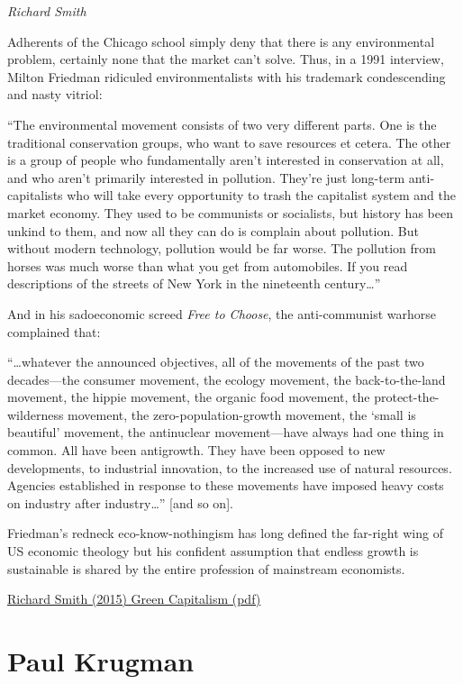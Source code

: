 \documentclass[
]{book}
\begin{document}
\emph{Richard Smith}

Adherents of the Chicago school simply deny
that there is any environmental problem, certainly none that the market can't solve.
Thus, in a 1991 interview, Milton Friedman ridiculed environmentalists with his
trademark condescending and nasty vitriol:

``The environmental movement consists of two very different
parts. One is the traditional conservation groups, who want to save
resources et cetera. The other is a group of people who
fundamentally aren't interested in conservation at all, and who
aren't primarily interested in pollution. They're just long-term
anti-capitalists who will take every opportunity to trash the
capitalist system and the market economy. They used to be
communists or socialists, but history has been unkind to them, and
now all they can do is complain about pollution. But without
modern technology, pollution would be far worse. The pollution
from horses was much worse than what you get from automobiles.
If you read descriptions of the streets of New York in the
nineteenth century\ldots{}''

And in his sadoeconomic screed \emph{Free to Choose}, the anti-communist warhorse
complained that:

``\ldots whatever the announced objectives, all of the movements of
the past two decades---the consumer movement, the ecology
movement, the back-to-the-land movement, the hippie movement,
the organic food movement, the protect-the-wilderness movement,
the zero-population-growth movement, the `small is beautiful'
movement, the antinuclear movement---have always had one thing
in common. All have been antigrowth. They have been opposed to
new developments, to industrial innovation, to the increased use of
natural resources. Agencies established in response to these
movements have imposed heavy costs on industry after
industry\ldots{}'' {[}and so on{]}.

Friedman's redneck eco-know-nothingism has long defined the far-right wing of US
economic theology but his confident assumption that endless growth is sustainable is
shared by the entire profession of mainstream economists.

\href{pdf/Richard_Smith_Green_Capitalism_the_God_that_Failed.pdf}{Richard Smith (2015) Green Capitalism (pdf)}

\hypertarget{paul-krugman}{%
\section{Paul Krugman}\label{paul-krugman}}
\end{document}
